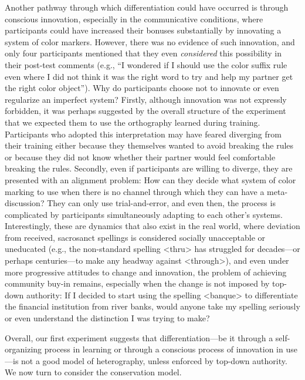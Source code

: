 \documentclass[doc,biblatex]{apa7}
\begin{document}
Another pathway through which differentiation could have occurred is through conscious innovation, especially in the communicative conditions, where participants could have increased their bonuses substantially by innovating a system of color markers. However, there was no evidence of such innovation, and only four participants mentioned that they even \textit{considered} this possibility in their post-test comments (e.g., ``I wondered if I should use the color suffix rule even where I did not think it was the right word to try and help my partner get the right color object''). Why do participants choose not to innovate or even regularize an imperfect system? Firstly, although innovation was not expressly forbidden, it was perhaps suggested by the overall structure of the experiment that we expected them to use the orthography learned during training. Participants who adopted this interpretation may have feared diverging from their training either because they themselves wanted to avoid breaking the rules or because they did not know whether their partner would feel comfortable breaking the rules. Secondly, even if participants are willing to diverge, they are presented with an alignment problem: How can they decide what system of color marking to use when there is no channel through which they can have a meta-discussion? They can only use trial-and-error, and even then, the process is complicated by participants simultaneously adapting to each other's systems. Interestingly, these are dynamics that also exist in the real world, where deviation from received, sacrosanct spellings is considered socially unacceptable or uneducated (e.g., the non-standard spelling <thru> has struggled for decades---or perhaps centuries---to make any headway against <through>), and even under more progressive attitudes to change and innovation, the problem of achieving community buy-in remains, especially when the change is not imposed by top-down authority: If I decided to start using the spelling <banque> to differentiate the financial institution from river banks, would anyone take my spelling seriously or even understand the distinction I was trying to make?

Overall, our first experiment suggests that differentiation---be it through a self-organizing process in learning or through a conscious process of innovation in use---is not a good model of heterography, unless enforced by top-down authority. We now turn to consider the conservation model.

\end{document}

